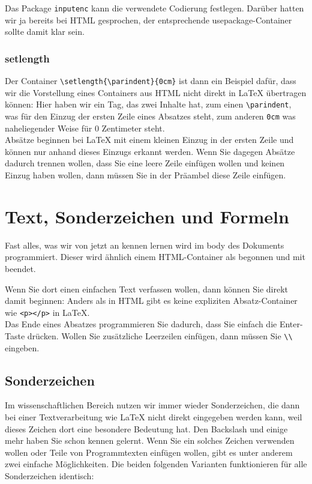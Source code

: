 Das Package \verb|inputenc| kann die verwendete Codierung festlegen. Darüber hatten wir ja bereits bei HTML gesprochen, der entsprechende usepackage-Container sollte damit klar sein.

\subsubsection{setlength}

Der Container \verb|\setlength{\parindent}{0cm}| ist dann ein Beispiel dafür, dass wir die Vorstellung eines Containers aus HTML nicht direkt in LaTeX übertragen können: Hier haben wir ein \glqq{}Tag\grqq{}, das zwei Inhalte hat, zum einen \verb|\parindent|, was für den Einzug der ersten Zeile eines Absatzes steht, zum anderen \verb|0cm| was naheliegender Weise für 0 Zentimeter steht.\\

Absätze beginnen bei LaTeX mit einem kleinen Einzug in der ersten Zeile und können nur anhand dieses Einzugs erkannt werden. Wenn Sie dagegen Absätze dadurch trennen wollen, dass Sie eine leere Zeile einfügen wollen und keinen Einzug haben wollen, dann müssen Sie in der Präambel diese Zeile einfügen.\\

\section{Text, Sonderzeichen und Formeln}

Fast alles, was wir von jetzt an kennen lernen wird im body des Dokuments programmiert. Dieser wird ähnlich einem HTML-Container als \verb|| begonnen und mit \verb|| beendet.

Wenn Sie dort einen einfachen Text verfassen wollen, dann können Sie direkt damit beginnen: Anders als in HTML gibt es keine expliziten Absatz-Container wie \verb|<p></p>| in LaTeX.\\

Das Ende eines Absatzes \glqq{}programmieren\grqq{} Sie dadurch, dass Sie einfach die Enter-Taste drücken. Wollen Sie zusätzliche Leerzeilen einfügen, dann müssen Sie \verb|\\| eingeben.

\subsection{Sonderzeichen}

Im wissenschaftlichen Bereich nutzen wir immer wieder Sonderzeichen, die dann bei einer Textverarbeitung wie LaTeX nicht direkt eingegeben werden kann, weil dieses Zeichen dort eine besondere Bedeutung hat. Den Backslash und einige mehr haben Sie schon kennen gelernt. Wenn Sie ein solches Zeichen verwenden wollen oder Teile von Programmtexten einfügen wollen, gibt es unter anderem zwei einfache Möglichkeiten. Die beiden folgenden Varianten funktionieren für alle Sonderzeichen identisch:\\

